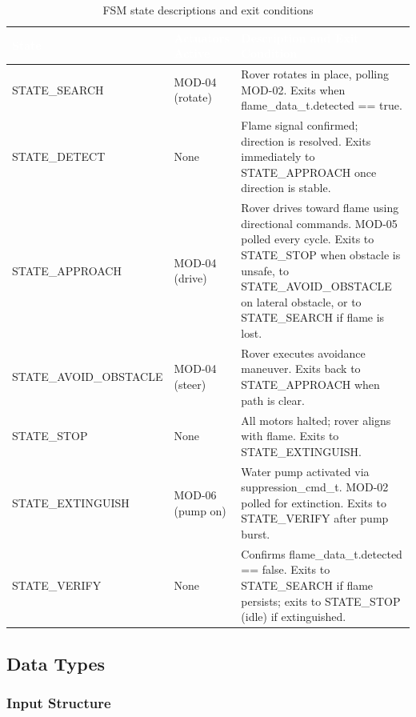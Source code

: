 \documentclass[12pt,a4paper]{article}
\newcommand{\theadtext}[1]{\textcolor{white}{\textbf{#1}}}
\newcommand{\fn}[1]{{\footnotesize\ttfamily #1}}
\begin{document}
\begin{table}[H]
\centering\small
\begin{tabularx}{\textwidth}{L{3.8cm} L{2.5cm} X}
\toprule
{}
\theadtext{State} & \theadtext{Actuators Active} & \theadtext{Description and Exit Condition} \\
\midrule
{}   \fn{STATE\_SEARCH}         & MOD-04 (rotate)   & Rover rotates in place, polling MOD-02. Exits when \fn{flame\_data\_t.detected == true}. \\[3pt]
 \fn{STATE\_DETECT}         & None              & Flame signal confirmed; direction is resolved. Exits immediately to \fn{STATE\_APPROACH} once direction is stable. \\[3pt]
   \fn{STATE\_APPROACH}       & MOD-04 (drive)    & Rover drives toward flame using directional commands. MOD-05 polled every cycle. Exits to \fn{STATE\_STOP} when obstacle is unsafe, to \fn{STATE\_AVOID\_OBSTACLE} on lateral obstacle, or to \fn{STATE\_SEARCH} if flame is lost. \\[3pt]
 \fn{STATE\_AVOID\_OBSTACLE} & MOD-04 (steer)  & Rover executes avoidance maneuver. Exits back to \fn{STATE\_APPROACH} when path is clear. \\[3pt]
   \fn{STATE\_STOP}           & None              & All motors halted; rover aligns with flame. Exits to \fn{STATE\_EXTINGUISH}. \\[3pt]
 \fn{STATE\_EXTINGUISH}     & MOD-06 (pump on)  & Water pump activated via \fn{suppression\_cmd\_t}. MOD-02 polled for extinction. Exits to \fn{STATE\_VERIFY} after pump burst. \\[3pt]
   \fn{STATE\_VERIFY}         & None              & Confirms \fn{flame\_data\_t.detected == false}. Exits to \fn{STATE\_SEARCH} if flame persists; exits to \fn{STATE\_STOP} (idle) if extinguished. \\
\bottomrule
\end{tabularx}
\caption{FSM state descriptions and exit conditions}
\end{table}

\subsection{Data Types}

\subsubsection{Input Structure}
\end{document}
